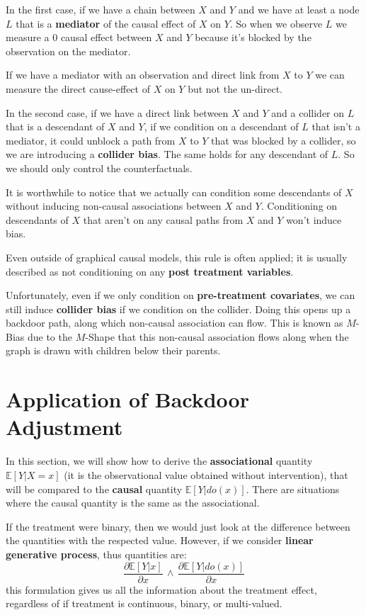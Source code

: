 In the first case, if we have a chain between $X$ and $Y$ and we have at least a
node $L$ that is a \textbf{mediator} of the causal effect of $X$ on $Y$. So when
we observe $L$ we measure a $0$ causal effect between $X$ and $Y$ because it's
blocked by the observation on the mediator.

If we have a mediator with an observation and direct link from $X$ to $Y$ we
can measure the direct cause-effect of $X$ on $Y$ but not the un-direct.

In the second case, if we have a direct link between $X$ and $Y$ and a collider
on $L$ that is a descendant of $X$ and $Y$, if we condition on a descendant of $L$
that isn't a mediator, it could unblock a path from $X$ to $Y$ that was blocked
by a collider, so we are introducing a \textbf{collider bias}. The same holds
for any descendant of $L$. So we should only control the counterfactuals.

It is worthwhile to notice that we actually can condition some descendants of
$X$ without inducing non-causal associations between $X$ and $Y$. Conditioning
on descendants of $X$ that aren't on any causal paths from $X$ and $Y$ won't
induce bias.

Even outside of graphical causal models, this rule is often applied; it is usually described
as not conditioning on any \textbf{post treatment variables}.

Unfortunately, even if we only condition on \textbf{pre-treatment covariates}, we
can still induce \textbf{collider bias} if we condition on the collider. Doing
this opens up a backdoor path, along which non-causal association can flow. This
is known as $M$-Bias due to the $M$-Shape that this non-causal association flows
along when the graph is drawn with children below their parents.

\section{Application of Backdoor Adjustment}
In this section, we will show how to derive the \textbf{associational} quantity
$\mathbb{E}[Y|X = x]$ (it is the observational value obtained without intervention),
that will be compared to the \textbf{causal} quantity $\mathbb{E}[Y|do(x)]$. There
are situations where the causal quantity is the same as the associational.

If the treatment were binary, then we would just look at the difference between
the quantities with the respected value. However, if we consider \textbf{linear
    generative process}, thus quantities are:
\begin{equation}
    \frac{\partial\mathbb{E}[Y |x]}{\partial x } \, \land \, \frac{\partial\mathbb{E}[Y |do(x)]}{\partial x}
\end{equation}
this formulation gives us all the information about the treatment effect, regardless
of if treatment is continuous, binary, or multi-valued.

